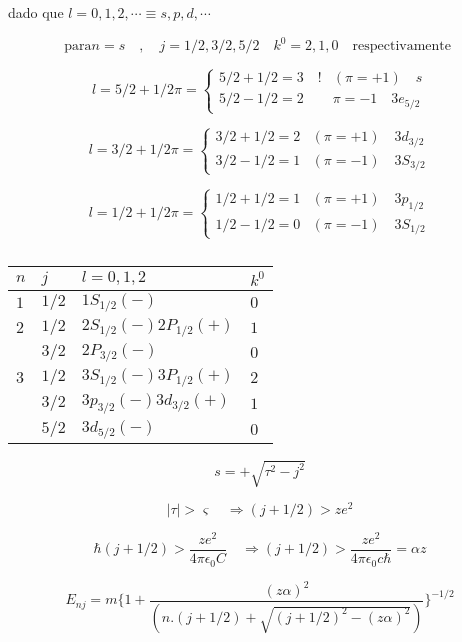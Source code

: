 \documentclass{report}
\begin{document}
dado que $l = 0,1,2,\cdots \equiv s,p,d,\cdots$

\[\text{para} n = s \quad , \quad j = 1/2,3/2,5/2 \quad k^0 =2,1,0 \quad \text{respectivamente }\]

\[l = 5/2 +1/2 \pi  = \begin{cases} 5/2+1/2 = 3 \quad \text{!}  & (\pi = + 1) \quad  s \\
5/2-1/2 = 2  & \pi = - 1 \quad  3 e_{5/2}  \end{cases} \]

\[l = 3/2 +1/2 \pi  = \begin{cases} 3/2+1/2 = 2  & (\pi = + 1) \quad  3d_{3/2} \\

3/2-1/2 = 1  & (\pi = - 1) \quad  3 S_{3/2}  \end{cases}\]

\[l = 1/2 +1/2 \pi  = \begin{cases} 1/2+1/2 = 1  & (\pi = + 1) \quad  3p_{1/2} \\

1/2-1/2 = 0  & (\pi = - 1) \quad  3 S_{1/2}  \end{cases}\]

\begin{table}[htbp]
\caption{}
\begin{tabular}{|l|l|l|l|}
\hline
$n$ & $j$ & $l=0,1,2$ & $k^{0}$ \\ \hline
$1$ & $1/2$ & $1S_{1/2}(-)$ & $0$ \\ \hline
$2$ & $1/2$ & $2S_{1/2}(-)2P_{1/2}(+)$ & $1$ \\ \hline
 & $3/2$ & $2P_{3/2}(-)$ & $0$ \\ \hline
$3$ & $1/2$ & $3S_{1/2}(-)3P_{1/2}(+)$ & $2$ \\ \hline
 & $3/2$ & $3p_{3/2}(-)3d_{3/2}(+)$ & $1$ \\ \hline
 & $5/2$ & $3d_{5/2}(-)$ & $0$ \\ \hline
\end{tabular}
\label{}
\end{table}


\[s = + \sqrt{\tau^2 - j^2}\]

\[|\tau| > \varsigma \quad \Rightarrow (j+1/2)>ze^2\]

\[\hbar (j+1/2)>\frac{ze^2}{4\pi \epsilon_0 C} \quad \Rightarrow (j+1/2)>\frac{ze^2}{4 \pi \epsilon_0 c \hbar} = \alpha z\]

\begin{equation}
E_{nj} = m \lbrace 1 + \frac{(z \alpha)^2 }{(n . (j+1/2) + \sqrt{(j+1/2)^2 - (z \alpha)^2})} \rbrace ^{-1/2}
\end{equation}
\end{document}
